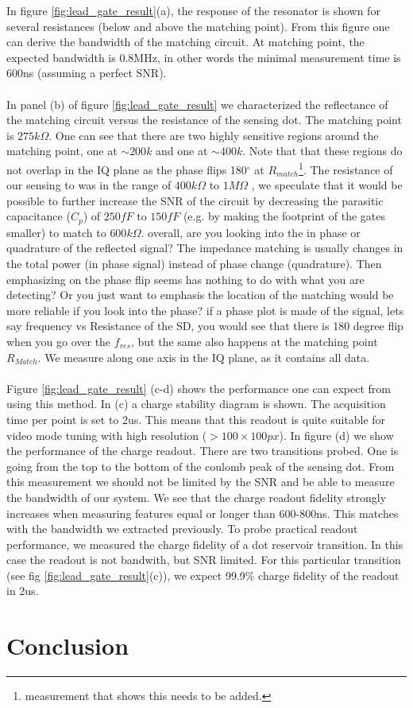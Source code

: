 \documentclass[]{article}
\begin{document}
In figure \ref{fig:lead_gate_result}(a), the response of the resonator is shown for several resistances (below and above the matching point). From this figure one can derive the bandwidth of the matching circuit. At matching point, the expected bandwidth is 0.8MHz, in other words the minimal measurement time is 600ns (assuming a perfect SNR).
\\ \\
In panel (b) of figure \ref{fig:lead_gate_result} we characterized the reflectance of the matching circuit versus the resistance of the sensing dot. The matching point is $275k\Omega$. One can see that there are two highly sensitive regions around the matching point, one at $\sim200k$ and one at $\sim400k$. Note that that these regions do not overlap in the IQ plane as the phase flips 180$^\circ$ at $R_{match}$\footnote{measurement that shows this needs to be added.}.
The resistance of our sensing to was in the range of $400k\Omega$ to $1M\Omega$
, we speculate that it would be possible to further increase the SNR of the circuit by decreasing the parasitic capacitance ($C_p$) of $250fF$ to $150fF$ (e.g. by making the footprint of the gates smaller) to match to $600k\Omega$. \color{red} overall, are you looking into the in phase or quadrature of the reflected signal? The impedance matching is usually changes in the total power (in phase signal) instead of phase change (quadrature). Then emphasizing on the phase flip seems has nothing to do with what you are detecting? Or you just want to emphasis the location of the matching would be more reliable if you look into the phase? \color{blue} if a phase plot is made of the signal, lets say frequency vs Resistance of the SD, you would see that there is 180 degree flip when you go over the $f_{res}$, but the same also happens at the matching point $R_{Match}$. We measure along one axis in the IQ plane, as it contains all data. \color{black} 
\\ \\
Figure \ref{fig:lead_gate_result} (c-d) shows the performance one can expect from using this method. In (c) a charge stability diagram is shown. The acquisition time per point is set to 2us. This means that this readout is quite suitable for video mode tuning with high resolution ($>100\times100px$). In figure (d) we show the performance of the charge readout. There are two transitions probed. One is going from the top to the bottom of the coulomb peak of the sensing dot. From this measurement we should not be limited by the SNR and be able to measure the bandwidth of our system. We see that the charge readout fidelity strongly increases when measuring features equal or longer than 600-800ns. This matches with the bandwidth we extracted previously. To probe practical readout performance, we measured the charge fidelity of a dot reservoir transition. In this case the readout is not bandwith, but SNR limited. For this particular transition (see fig \ref{fig:lead_gate_result}(c)), we expect 99.9\% charge fidelity of the readout in 2us.

\section{Conclusion}
 
\printbibliography
	
\end{document}
